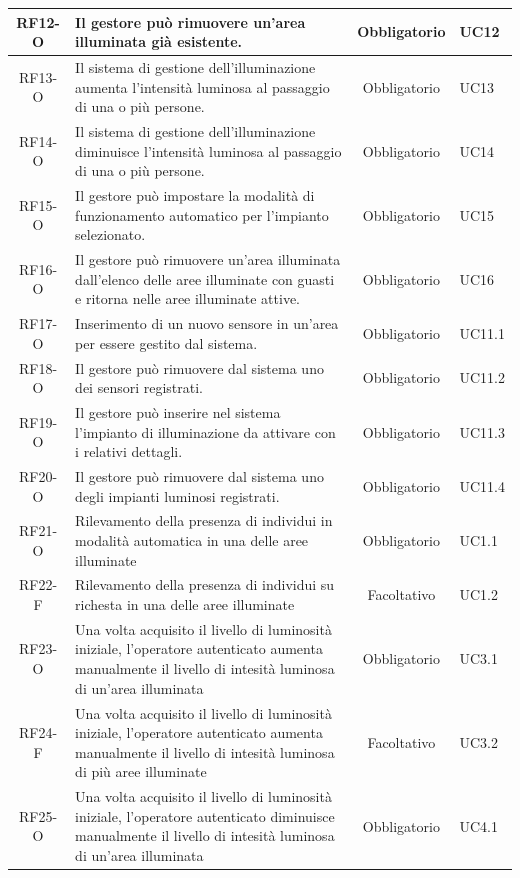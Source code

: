 \documentclass[a4paper, 12pt]{article}
\begin{document}
\begin{longtable}{|c|p{7cm}|c|p{4cm}|}
    \hline
    RF12-O & Il gestore può rimuovere un'area illuminata già esistente. & Obbligatorio & UC12 \\
    \hline
    RF13-O & Il sistema di gestione dell'illuminazione aumenta l'intensità luminosa al passaggio di una o più persone. & Obbligatorio & UC13 \\
    \hline
    RF14-O & Il sistema di gestione dell'illuminazione diminuisce l'intensità luminosa al passaggio di una o più persone. & Obbligatorio & UC14 \\
    \hline
    RF15-O & Il gestore può impostare la modalità di funzionamento automatico per l'impianto selezionato. & Obbligatorio & UC15 \\
    \hline
    RF16-O & Il gestore può rimuovere un'area illuminata dall'elenco delle aree illuminate con guasti e ritorna nelle aree illuminate attive. & Obbligatorio & UC16 \\
    \hline
    RF17-O & Inserimento di un nuovo sensore in un'area per essere gestito dal sistema. & Obbligatorio & UC11.1 \\
    \hline
    RF18-O & Il gestore può rimuovere dal sistema uno dei sensori registrati. & Obbligatorio & UC11.2\\
    \hline
    RF19-O & Il gestore può inserire nel sistema l'impianto di illuminazione da attivare con i relativi dettagli. & Obbligatorio & UC11.3\\
    \hline
    RF20-O & Il gestore può rimuovere dal sistema uno degli impianti luminosi registrati. & Obbligatorio & UC11.4 \\
    \hline
    RF21-O & Rilevamento della presenza di individui in modalità automatica in una delle aree illuminate & Obbligatorio & UC1.1 \\
    \hline
    RF22-F & Rilevamento della presenza di individui su richesta in una delle aree illuminate & Facoltativo & UC1.2 \\
    \hline
    RF23-O & Una volta acquisito il livello di luminosità iniziale, l'operatore autenticato aumenta manualmente il livello di intesità luminosa di un'area illuminata & Obbligatorio & UC3.1 \\
    \hline
    RF24-F & Una volta acquisito il livello di luminosità iniziale, l'operatore autenticato aumenta manualmente il livello di intesità luminosa di più aree illuminate & Facoltativo & UC3.2 \\
    \hline
    RF25-O & Una volta acquisito il livello di luminosità iniziale, l'operatore autenticato diminuisce manualmente il livello di intesità luminosa di un'area illuminata & Obbligatorio & UC4.1 \\

\end{longtable}
\end{document}
